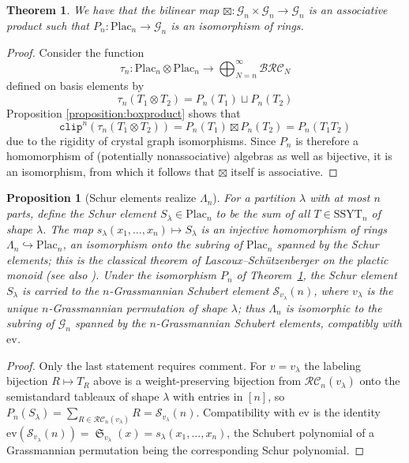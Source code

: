 \documentclass{amsart}
\newtheorem{proposition}[lemma]{Proposition}
\newtheorem{theorem}{Theorem}[section]
\theoremstyle{definition}
\theoremstyle{remark}
\numberwithin{equation}{subsection}
\DeclareMathOperator{\sch}{\mathfrak{S}}
\newcommand{\grass}{\mathcal{G}}
\newcommand{\plac}{\mathrm{Plac}}
\newcommand{\clp}{\mathtt{clip}}
\newcommand{\BRC}{\mathcal{BRC}}
\newcommand{\RC}{\mathcal{RC}}
\begin{document}
\begin{theorem} \label{theorem:placticiso}
We have that the bilinear map $\boxtimes: \grass_n\times \grass_n\to\grass_n$ is an associative product such that $P_n:\plac_n\to \grass_n$ is an isomorphism of rings.
\end{theorem}
\begin{proof}
Consider the function 
$$\tau_n:\plac_n\otimes \plac_n\to \bigoplus_{N = n}^\infty \BRC_N$$ 
defined on basis elements by
$$\tau_n(T_1\otimes T_2) = P_n(T_1)\sqcup P_n(T_2)$$
Proposition \ref{proposition:boxproduct} shows that
$$\clp^n(\tau_n(T_1\otimes T_2)) = P_n(T_1)\boxtimes P_n(T_2) = P_n(T_1T_2)$$
due to the rigidity of crystal graph isomorphisms. Since $P_n$ is therefore a homomorphism of (potentially nonassociative) algebras as well as bijective, it is an isomorphism, from which it follows that $\boxtimes$ itself is associative.
\end{proof}

\begin{proposition}[Schur elements realize $\Lambda_n$]\label{proposition:schurelements}
For a partition $\lambda$ with at most $n$ parts, define the \emph{Schur element} $S_\lambda\in\plac_n$ to be the sum of all $T\in\mathrm{SSYT}_n$ of shape $\lambda$. The map $s_\lambda(x_1,\ldots,x_n)\mapsto S_\lambda$ is an injective homomorphism of rings $\Lambda_n\hookrightarrow\plac_n$, an isomorphism onto the subring of $\plac_n$ spanned by the Schur elements; this is the classical theorem of Lascoux--Sch\"utzenberger on the plactic monoid \cite{lascoux1981plactic} (see also \cite[Ch.~2]{fulton1997young}). Under the isomorphism $P_n$ of Theorem~\ref{theorem:placticiso}, the Schur element $S_\lambda$ is carried to the $n$-Grassmannian Schubert element $\mathcal{S}_{v_\lambda}(n)$, where $v_\lambda$ is the unique $n$-Grassmannian permutation of shape $\lambda$; thus $\Lambda_n$ is isomorphic to the subring of $\grass_n$ spanned by the $n$-Grassmannian Schubert elements, compatibly with $\mathrm{ev}$.
\end{proposition}
\begin{proof}
Only the last statement requires comment. For $v=v_\lambda$ the labeling bijection $R\mapsto T_R$ above is a weight-preserving bijection from $\RC_n(v_\lambda)$ onto the semistandard tableaux of shape $\lambda$ with entries in $[n]$, so $P_n(S_\lambda)=\sum_{R\in\RC_n(v_\lambda)}R=\mathcal{S}_{v_\lambda}(n)$. Compatibility with $\mathrm{ev}$ is the identity $\mathrm{ev}(\mathcal{S}_{v_\lambda}(n))=\sch_{v_\lambda}(x)=s_\lambda(x_1,\ldots,x_n)$, the Schubert polynomial of a Grassmannian permutation being the corresponding Schur polynomial.
\end{proof}
\end{document}

